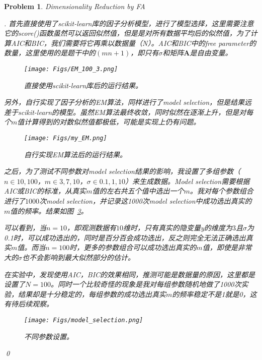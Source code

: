 \documentclass[UTF8]{article}
\newtheorem{hw}{Problem}
\newenvironment{sol}
  {\par\vspace{3mm}\noindent{\it Solution}.}
  {\qed}
\newcommand{\Amat}{{\boldsymbol A}}
\begin{document}
\begin{hw}
	Dimensionality Reduction by FA
	
	\begin{sol}
		首先直接使用了scikit-learn库的因子分析模型，进行了模型选择，这里需要注意它的score()函数虽然可以返回似然值，但是是对所有数据平均后的似然值，为了计算AIC和BIC，我们需要将它再乘以数据量（N）。AIC和BIC中的free parameter的数量，这里使用的是题干中的$(mn+1)$，即只有$\sigma$和矩阵$\Amat$是自由变量。
		\begin{figure}
			\centering
			\texttt{[image: Figs/EM\_100\_3.png]}
			\vspace{-0.1cm}
			\caption{直接使用scikit-learn库后的运行结果。}
			\label{fig:EM}
		\end{figure}
		
		另外，自行实现了因子分析的EM算法，同样进行了model selection，但是结果远差于scikit-learn的模型。虽然EM算法最终收敛，同时似然在逐渐上升，但是对每个$m$值计算得到的对数似然值都极低，可能是实现上仍有问题。
		\begin{figure}
			\centering
			\texttt{[image: Figs/my\_EM.png]}
			\vspace{-0.1cm}
			\caption{自行实现EM算法后的运行结果。}
			\label{fig:my_EM}
		\end{figure}
		
		之后，为了测试不同参数对model selection结果的影响，我设置了多组参数（$n\in{10,100}$，$m\in{3,7,10}$，$\sigma\in{0.1,1,10}$）来生成数据。Model selection需要根据AIC或BIC的标准，从真实$m$值的左右共五个值中选出一个$m$。我对每个参数组合进行了$1000$次model selection，并记录这1000次model selection中成功选出真实的$m$值的频率。结果如图~\ref{fig:compare}。
		
		可以看到，当$n=10$，即观测数据有$10$维时，只有真实的隐变量y的维度为$3$且$\sigma$为0.1时，可以成功选出的，同时是百分百会成功选出，反之则完全无法正确选出真实$m$值。而当$n=100$时，更多的参数组合可以成功选出真实的$m$值，即使是非常大的$\sigma$也不会影响到最大似然部分的估计。
		
		在实验中，发现使用AIC，BIC的效果相同，推测可能是数据量的原因，这里都是设置了$N=100$。同时一个比较奇怪的现象是我对每组参数随机地做了1000次实验，结果却是十分稳定的，每组参数的成功选出真实$m$的频率稳定不是1就是0，这有待后续观察。
		
		\begin{figure}
			\centering
			\texttt{[image: Figs/model\_selection.png]}
			\vspace{-0.1cm}
			\caption{不同参数设置。}
			\label{fig:compare}
		\end{figure}
	\end{sol}
\end{hw}
\end{document}
